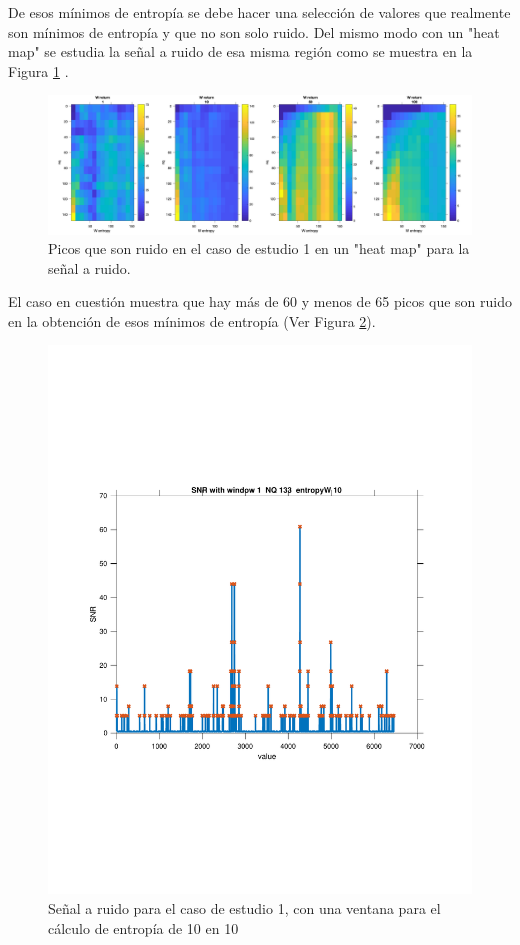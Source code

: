 De esos mínimos de entropía se debe hacer una selección de valores que realmente son mínimos de entropía y que no son solo ruido. Del mismo modo con un "heat map" se estudia la señal a ruido de esa misma región como se muestra en la Figura \ref{caso1SNR} .

\begin{figure}[h]
	\centering
	\includegraphics[width=0.7\linewidth]{figures_matlab/SNR}
	\caption{Picos que son ruido en el caso de estudio 1 en un "heat map" para la señal a ruido.}
	\label{caso1SNR}
\end{figure}

El caso en cuestión muestra que hay más de 60 y menos de 65 picos que son ruido en la obtención de esos mínimos de entropía (Ver Figura \ref{caso1SNR_individual}). 


\begin{figure}[h]
	\centering
	\includegraphics[width=0.7\linewidth]{figures_matlab/SNR_window_1_NQ_133_entropyW_10}
	\caption{Señal a ruido para el caso de estudio 1, con una ventana para el cálculo de entropía de 10 en 10 }
	\label{caso1SNR_individual}
\end{figure}

